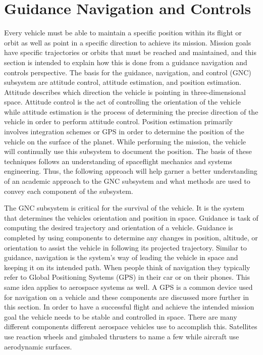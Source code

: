 \documentclass{article}
\begin{document}
\section{Guidance Navigation and Controls}

Every vehicle must be able to maintain a specific position within
its flight or orbit as well as point in a specific direction to achieve its
mission. Mission goals have specific trajectories or orbits that must
be reached and maintained, and this section is intended to explain
how this is done from a guidance navigation and controls
perspective. The basis for the guidance, navigation, and control (GNC)
subsystem are attitude control, attitude estimation, and position
estimation. Attitude describes which direction the vehicle is
pointing in three-dimensional space. Attitude control is the act of controlling
the orientation of the vehicle while attitude estimation is the
process of determining the precise direction of the vehicle in order
to perform attitude control. Position estimation primarily involves
integration schemes or GPS in order to determine the position of the
vehicle on the surface of the planet. While performing the mission,
the vehicle will continually use this subsystem to document the
position. The basis of these techniques follows an understanding of
spaceflight mechanics and systems engineering. Thus, the following
approach will help garner a better understanding of an academic
approach to the GNC subsystem and what methods are used to convey each
component of the subsystem. 

The GNC subsystem is critical for the survival of the vehicle. It
is the system that determines the vehicles orientation and position
in space. Guidance is task of computing the desired trajectory and
orientation of a vehicle. Guidance is completed by using
components to determine any changes in position, altitude, or
orientation to assist the vehicle in following its projected
trajectory. Similar to guidance, navigation is the system's way of
leading the vehicle in space and keeping it on its intended
path. When people think of navigation they typically refer to Global
Positioning Systems (GPS) in their car or on their phones. This same
idea applies to aerospace systems as well. A GPS is a common device used for
navigation on a vehicle and these components are discussed more
further in this section. In order to have a successful flight and
achieve the intended mission goal the vehicle needs to be stable and
controlled in space. There are many different components different
aerospace vehicles use to accomplish this. Satellites
use reaction wheels and gimbaled thrusters to name a few while
aircraft use aerodynamic surfaces.
\end{document}
